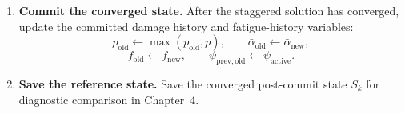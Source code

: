 \begin{enumerate}
    \item \textbf{Commit the converged state.} After the staggered solution has converged, update the committed damage history and fatigue-history variables:
    \[
    p_{\mathrm{old}}
    \leftarrow
    \max(p_{\mathrm{old}},p),
    \qquad
    \bar{\alpha}_{\mathrm{old}}
    \leftarrow
    \bar{\alpha}_{\mathrm{new}},
    \]
    \[
    f_{\mathrm{old}}
    \leftarrow
    f_{\mathrm{new}},
    \qquad
    \psi_{\mathrm{prev,old}}
    \leftarrow
    \psi_{\mathrm{active}}.
    \]

    \item \textbf{Save the reference state.} Save the converged post-commit state \(S_k\) for diagnostic comparison in Chapter~4.
\end{enumerate}




